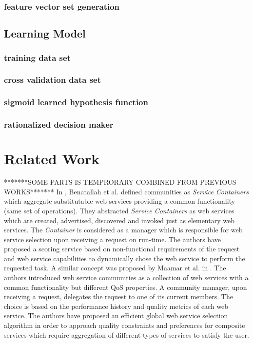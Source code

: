 \documentclass[10pt,journal,cspaper,compsoc]{IEEEtran}
\begin{document}
\subsubsection{feature vector set generation}\label{sss:fvg}


\subsection{Learning Model}\label{ss:learningmodel}

\subsubsection{training data set}\label{sss:tds}
\subsubsection{cross validation data set}\label{sss:cvds}
\subsubsection{sigmoid learned hypothesis function}\label{sss:slh}
\subsubsection{rationalized decision maker}\label{sss:rdm}


\section{Related Work}\label{s:related_work}

*******SOME PARTS IS TEMPRORARY COMBINED FROM PREVIOUS WORKS*******
In \cite{DBLP:journals/internet/BenatallahSD03}, Benatallah et al.
defined communities as \emph{Service Containers} which aggregate
substitutable web services providing a common functionality (same
set of operations). They abstracted \emph{Service Containers} as
web services which are created, advertised, discovered and invoked
just as elementary web services. The \emph{Container} is
considered as a manager which is responsible for web service
selection upon receiving a request on run-time. The authors have
proposed a scoring service based on non-functional requirements of
the request and web service capabilities to dynamically chose the
web service to perform the requested task. A similar concept was
proposed by Maamar et al. in
\cite{DBLP:journals/ijebr/MaamarSTBB09}. The authors introduced
web service communities as a collection of web services with a
common functionality but different QoS properties. A community
manager, upon receiving a request, delegates the request to one of
its current members. The choice is based on the performance
history and quality metrics of each web service. The authors have
proposed an efficient global web service selection algorithm in
order to approach quality constraints and preferences for
composite services which require aggregation of different types of
services to satisfy the user.
\end{document}
